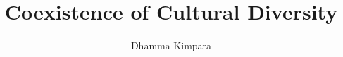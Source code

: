 \documentclass{article}
\theoremstyle{definition}
\begin{document}
\title{Coexistence of Cultural Diversity}
 \author{Dhamma Kimpara}


\renewcommand{\thefootnote}{\arabic{footnote}}

\maketitle





\newpage



\end{document}
